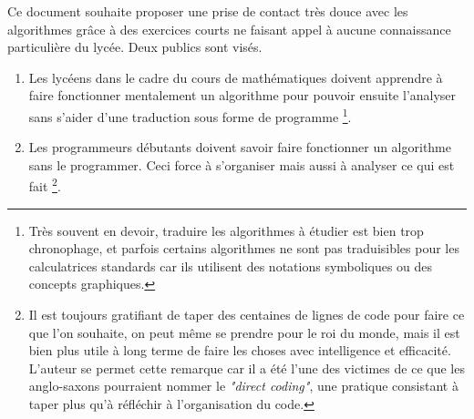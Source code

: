 Ce document souhaite proposer une prise de contact très douce avec les algorithmes grâce à des exercices courts ne faisant appel à aucune connaissance particulière du lycée. Deux publics sont visés.
\begin{enumerate}
    \item Les lycéens dans le cadre du cours de mathématiques doivent apprendre à faire fonctionner mentalement un algorithme pour pouvoir ensuite l'analyser sans s'aider d'une traduction sous forme de programme
\footnote{
    Très souvent en devoir, traduire les algorithmes à étudier est bien trop chronophage, et parfois certains algorithmes ne sont pas traduisibles pour les calculatrices standards car ils utilisent des notations symboliques ou des concepts graphiques.
}.

    \item Les programmeurs débutants doivent savoir faire fonctionner un algorithme sans le programmer. Ceci force à s'organiser mais aussi à analyser ce qui est fait
\footnote{
    Il est toujours gratifiant de taper des centaines de lignes de code pour faire ce que l'on souhaite, on peut même se prendre pour le roi du monde, mais il est bien plus utile à long terme de faire les choses avec intelligence et efficacité. L'auteur se permet cette remarque car il a été l'une des victimes de ce que les anglo-saxons pourraient nommer le \textit{"direct coding"}, une pratique consistant à taper plus qu'à réfléchir à l'organisation du code.
}.
\end{enumerate}
